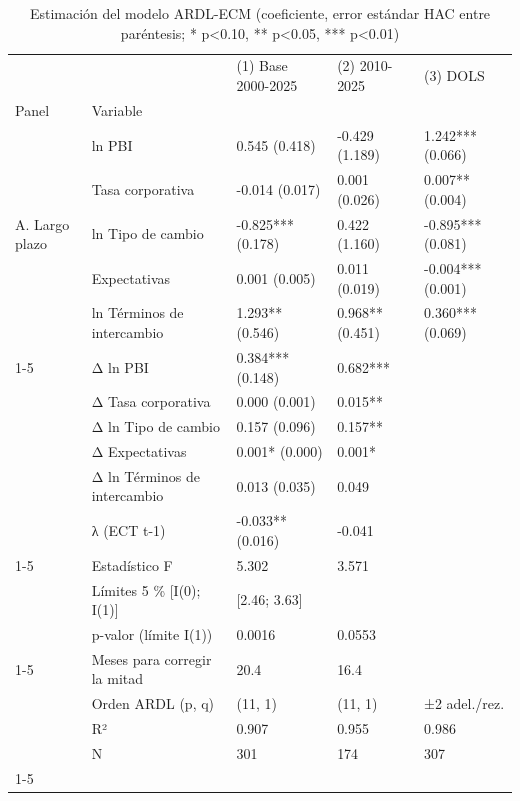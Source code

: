 \begin{table}
\caption{Estimación del modelo ARDL-ECM (coeficiente, error estándar HAC entre paréntesis; * p<0.10, ** p<0.05, *** p<0.01)}
\label{tab:tabla5_ardl_ecm}
\begin{tabular}{lllll}
\toprule
 &  & (1) Base 2000-2025 & (2) 2010-2025 & (3) DOLS \\
Panel & Variable &  &  &  \\
\midrule
\multirow[t]{5}{*}{A. Largo plazo} & ln PBI & 0.545 (0.418) & -0.429 (1.189) & 1.242*** (0.066) \\
 & Tasa corporativa & -0.014 (0.017) & 0.001 (0.026) & 0.007** (0.004) \\
 & ln Tipo de cambio & -0.825*** (0.178) & 0.422 (1.160) & -0.895*** (0.081) \\
 & Expectativas & 0.001 (0.005) & 0.011 (0.019) & -0.004*** (0.001) \\
 & ln Términos de intercambio & 1.293** (0.546) & 0.968** (0.451) & 0.360*** (0.069) \\
\cline{1-5}
\multirow[t]{6}{*}{B. Corto plazo} & Δ ln PBI & 0.384*** (0.148) & 0.682*** &  \\
 & Δ Tasa corporativa & 0.000 (0.001) & 0.015** &  \\
 & Δ ln Tipo de cambio & 0.157 (0.096) & 0.157** &  \\
 & Δ Expectativas & 0.001* (0.000) & 0.001* &  \\
 & Δ ln Términos de intercambio & 0.013 (0.035) & 0.049 &  \\
 & λ (ECT t-1) & -0.033** (0.016) & -0.041 &  \\
\cline{1-5}
\multirow[t]{3}{*}{C. Bounds test} & Estadístico F & 5.302 & 3.571 &  \\
 & Límites 5 \% [I(0); I(1)] & [2.46; 3.63] &  &  \\
 & p-valor (límite I(1)) & 0.0016 & 0.0553 &  \\
\cline{1-5}
\multirow[t]{4}{*}{C. Ajuste} & Meses para corregir la mitad & 20.4 & 16.4 &  \\
 & Orden ARDL (p, q) & (11, 1) & (11, 1) & ±2 adel./rez. \\
 & R² & 0.907 & 0.955 & 0.986 \\
 & N & 301 & 174 & 307 \\
\cline{1-5}
\bottomrule
\end{tabular}
\end{table}
